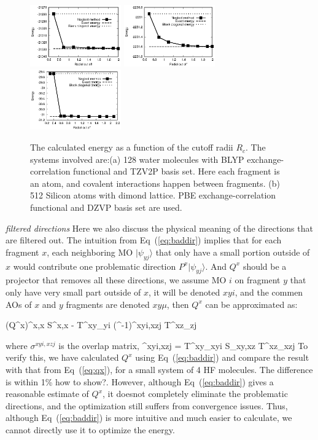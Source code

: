 \documentclass[prl,twocolumn,showpacs]{revtex4}
\begin{document}
\begin{figure}
\includegraphics[width=0.35\textwidth]{CdSe}
\includegraphics[width=0.35\textwidth]{H2O}
\includegraphics[width=0.35\textwidth]{Si}
\caption{The calculated energy as a function of the cutoff radii $R_c$. The systems involved are:(a) 128 water molecules with BLYP exchange-correlation functional and TZV2P basis set. Here each fragment is an atom, and covalent interactions happen between fragments. (b) 512 Silicon atoms with dimond lattice. PBE exchange-correlation functional and DZVP basis set are used.}
\label{fig:accuracy}
\end{figure}

\emph{filtered directions}
Here we also discuss the physical meaning of the directions that are filtered out. The intuition from Eq~(\ref{eq:baddir}) implies that for each fragment $x$, each neighboring MO $|\psi_{yj}\rangle$ that only have a small portion outside of $x$ would contribute one problematic direction $P^x | \psi_{yj}\rangle$. And $Q^x$ should be a projector that removes all these directions, we assume MO $i$ on fragment $y$ that only have very small part outside of $x$, it will be denoted $xyi$, and the commen AOs of $x$ and $y$ fragments are denoted $xy\mu$, then $Q^x$ can be approximated as:

\bea
(Q^x)^{x\mu,x\nu} \approx S^{x\mu,x\nu} - T^{xy\mu}_{yi} (\sigma^{-1})^{xyi,xzj} T^{xz\mu}_{zj}
\label{eq:approxq}
\eea

where $\sigma^{xyi,xzj}$ is the overlap matrix,
\bea
\sigma^{xyi,xzj} = T^{xy\mu}_{xyi} S_{xy\mu,xz\nu} T^{xz\nu}_{xzj}
\eea
To verify this, we have calculated $Q^x$ using Eq~(\ref{eq:baddir}) and compare the result with that from Eq~(\ref{eq:qx}), for a small system of 4 HF molecules. The difference is within 1\% \new how to show?\old. However, although Eq~(\ref{eq:baddir}) gives a reasonable estimate of $Q^x$, it doesnot completely eliminate the problematic directions, and the optimization still suffers from convergence issues. Thus, although Eq~(\ref{eq:baddir}) is more intuitive and much easier to calculate, we cannot directly use it to optimize the energy.
\end{document}

